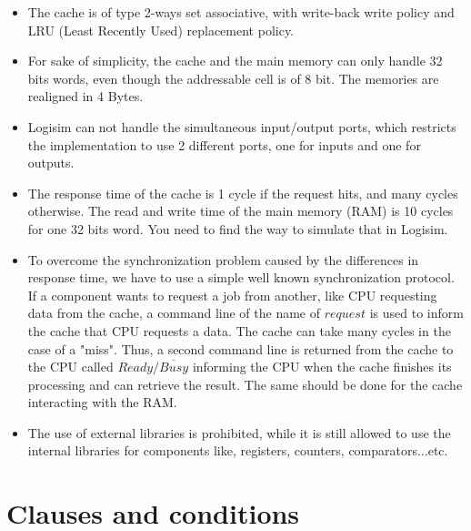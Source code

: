 \documentclass[a4paper, french, 12pt]{article}
\begin{document}
\begin{itemize}

    \item The cache is of type 2-ways set associative, with write-back write policy and LRU (Least Recently Used) replacement policy.
    \item For sake of simplicity, the cache and the main memory can only handle 32 bits words, even though the addressable cell is of 8 bit. The memories are realigned in 4 Bytes.
    \item Logisim can not handle the simultaneous input/output ports, which restricts the implementation to use 2 different ports, one for inputs and one for outputs.
    \item The response time of the cache is 1 cycle if the request hits, and many cycles otherwise. The read and write time of the main memory (RAM) is 10 cycles for one 32 bits word. You need to find the way to simulate that in Logisim.
    \item To overcome the synchronization problem caused by the differences in response time, we have to use a simple well known synchronization protocol. If a component wants to request a job from another, like CPU requesting data from the cache, a command line of the name of $request$ is used to inform the cache that CPU requests a data. The cache can take many cycles in the case of a "miss". Thus, a second command line is returned from the cache to the CPU called $Ready/\overline{Busy}$ informing the CPU when the cache finishes its processing and can retrieve the result. The same should be done for the cache interacting with the RAM.
    \item The use of external libraries is prohibited, while it is still allowed to use the internal libraries for components like, registers, counters, comparators...etc.
        
\end{itemize}

\section{Clauses and conditions}
\end{document}
